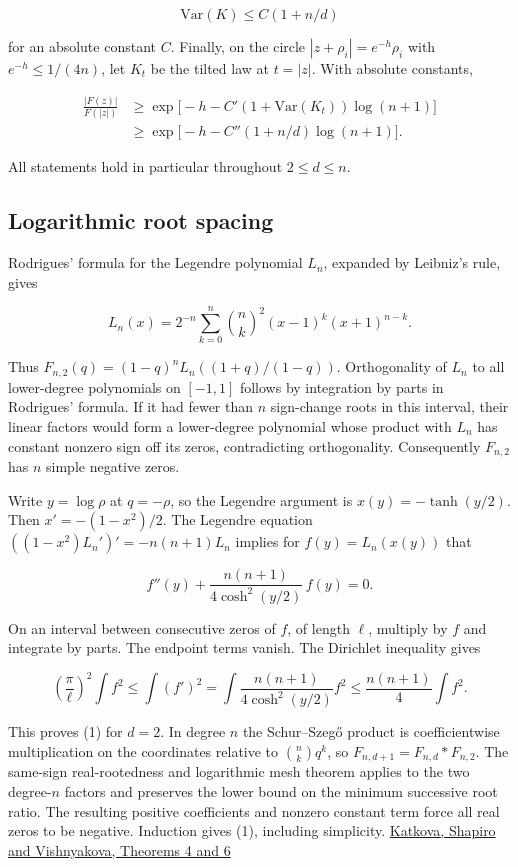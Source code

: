 \documentclass[11pt]{article}
\begin{document}
\[
\mathrm{Var}(K)\le C(1+n/d)
\tag{2}
\]

for an absolute constant $C$. Finally, on the circle $|z+\rho_i|=e^{-h}\rho_i$ with $e^{-h}\le1/(4n)$, let $K_t$ be the tilted law at $t=|z|$. With absolute constants,

\[
\begin{aligned}
\frac{|F(z)|}{F(|z|)}
&\ge \exp\bigl[-h-C'(1+\mathrm{Var}(K_t))\log(n+1)\bigr]\\
&\ge \exp\bigl[-h-C''(1+n/d)\log(n+1)\bigr].
\end{aligned}
\tag{3}
\]

All statements hold in particular throughout $2\le d\le n$.

\subsection{Logarithmic root spacing}

Rodrigues' formula for the Legendre polynomial $L_n$, expanded by Leibniz's rule, gives

\[
L_n(x)=2^{-n}\sum_{k=0}^n\binom nk^2(x-1)^k(x+1)^{n-k}.
\]

Thus $F_{n,2}(q)=(1-q)^nL_n((1+q)/(1-q))$. Orthogonality of $L_n$ to all lower-degree polynomials on $[-1,1]$ follows by integration by parts in Rodrigues' formula. If it had fewer than $n$ sign-change roots in this interval, their linear factors would form a lower-degree polynomial whose product with $L_n$ has constant nonzero sign off its zeros, contradicting orthogonality. Consequently $F_{n,2}$ has $n$ simple negative zeros.

Write $y=\log\rho$ at $q=-\rho$, so the Legendre argument is $x(y)=-\tanh(y/2)$. Then $x'=-(1-x^2)/2$. The Legendre equation $((1-x^2)L_n')'=-n(n+1)L_n$ implies for $f(y)=L_n(x(y))$ that

\[
f''(y)+\frac{n(n+1)}{4\cosh^2(y/2)}\,f(y)=0.
\]

On an interval between consecutive zeros of $f$, of length $\ell$, multiply by $f$ and integrate by parts. The endpoint terms vanish. The Dirichlet inequality gives

\[
\left(\frac{\pi}{\ell}\right)^2\int f^2
\le\int (f')^2
=\int\frac{n(n+1)}{4\cosh^2(y/2)}f^2
\le\frac{n(n+1)}4\int f^2.
\]

This proves (1) for $d=2$. In degree $n$ the Schur--Szeg\H{o} product is coefficientwise multiplication on the coordinates relative to $\binom nk q^k$, so $F_{n,d+1}=F_{n,d}*F_{n,2}$. The same-sign real-rootedness and logarithmic mesh theorem applies to the two degree-$n$ factors and preserves the lower bound on the minimum successive root ratio. The resulting positive coefficients and nonzero constant term force all real zeros to be negative. Induction gives (1), including simplicity. \href{https://doi.org/10.1016/j.crma.2010.11.031}{Katkova, Shapiro and Vishnyakova, Theorems 4 and 6}
\end{document}
